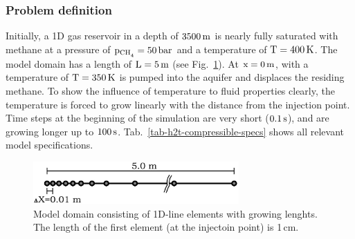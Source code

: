 \subsubsection*{Problem definition}

Initially, a 1D gas reservoir in a depth of $\unit[3500]{m}$ is nearly fully saturated with methane at a pressure of $\mathrm{p_{\ch4}}=\unit[50]{bar}$ and a temperature of $\mathrm{T}=\unit[400]{K}$. The model domain has a length of $\mathrm{L}=\unit[5]{m}$ (see Fig.~\ref{fig_model_setup}). At $\mathrm{x}=\unit[0]{m}$,  with a temperature of $\mathrm{T}=\unit[350]{K}$ is pumped into the aquifer and displaces the residing methane. To show the influence of temperature to fluid properties clearly, the temperature is forced to grow linearly with the distance from the injection point. Time steps at the beginning of the simulation are very short ($\unit[0.1]{s}$), and are growing longer up to $\unit[100]{s}$. Tab.~\ref{tab-h2t-compressible-specs} shows all relevant model specifications.

 \begin{figure}%
\centering
\includegraphics[width=0.7\textwidth]{FLUID_PROPERTIES/figures/modelsetup_h2t_compr.eps}
\captionsetup{format=hang,justification=raggedright,justification=justified}
\caption{Model domain consisting of 1D-line elements with growing lenghts. The length of the first element (at the injectoin point) is 1\,cm.}
\label{fig_model_setup}
\end{figure}


